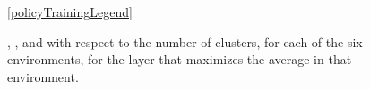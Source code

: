 \begin{figure}[t]
    \vspace{\LatentCurvesSubfigLegendSpacing}
    {\ref{policyTrainingLegend}}

    \caption[, , and  with respect to the number of clusters.]{, , and  with respect to the number of clusters, for each of the six environments, for the layer that maximizes the average  in that environment.}
    \label{fig:latent_space_curves_by_metric}
\end{figure}

